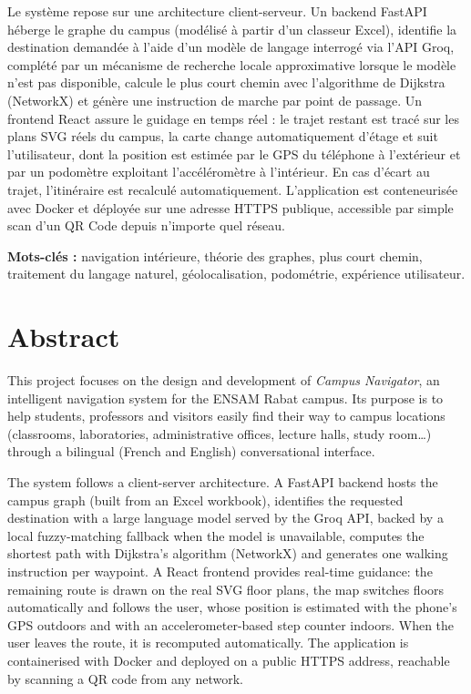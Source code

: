 \documentclass[12pt,a4paper]{report}
\begin{document}
Le système repose sur une architecture client-serveur. Un backend FastAPI héberge le graphe du
campus (modélisé à partir d'un classeur Excel), identifie la destination demandée à l'aide d'un
modèle de langage interrogé via l'API Groq, complété par un mécanisme de recherche locale
approximative lorsque le modèle n'est pas disponible, calcule le plus court chemin avec
l'algorithme de Dijkstra (NetworkX) et génère une instruction de marche par point de passage.
Un frontend React assure le guidage en temps réel : le trajet restant est tracé sur les plans SVG
réels du campus, la carte change automatiquement d'étage et suit l'utilisateur, dont la position
est estimée par le GPS du téléphone à l'extérieur et par un podomètre exploitant l'accéléromètre à
l'intérieur. En cas d'écart au trajet, l'itinéraire est recalculé automatiquement. L'application
est conteneurisée avec Docker et déployée sur une adresse HTTPS publique, accessible par simple
scan d'un QR Code depuis n'importe quel réseau.

\medskip
\noindent\textbf{Mots-clés :} navigation intérieure, théorie des graphes, plus court chemin,
traitement du langage naturel, géolocalisation, podométrie, expérience utilisateur.

\clearpage
\section*{Abstract}

This project focuses on the design and development of \emph{Campus Navigator}, an intelligent
navigation system for the ENSAM Rabat campus. Its purpose is to help students, professors and
visitors easily find their way to campus locations (classrooms, laboratories, administrative
offices, lecture halls, study room\ldots) through a bilingual (French and English)
conversational interface.

The system follows a client-server architecture. A FastAPI backend hosts the campus graph
(built from an Excel workbook), identifies the requested destination with a large language
model served by the Groq API, backed by a local fuzzy-matching fallback when the model is
unavailable, computes the shortest path with Dijkstra's algorithm (NetworkX) and generates one
walking instruction per waypoint. A React frontend provides real-time guidance: the remaining
route is drawn on the real SVG floor plans, the map switches floors automatically and follows
the user, whose position is estimated with the phone's GPS outdoors and with an
accelerometer-based step counter indoors. When the user leaves the route, it is recomputed
automatically. The application is containerised with Docker and deployed on a public HTTPS
address, reachable by scanning a QR code from any network.
\end{document}
